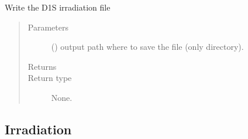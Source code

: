 \documentclass[letterpaper,10pt,english]{sphinxmanual}
\begin{document}
\begin{fulllineitems}
\begin{fulllineitems}
\end{fulllineitems}


\begin{fulllineitems}
\label{\detokenize{api/inputgeneration:parsersD1S.IrradiationFile.write}}
\sphinxAtStartPar
Write the D1S irradiation file
\begin{quote}\begin{description}
\item[{Parameters}] \leavevmode
\sphinxAtStartPar
{} () \textendash{} output path where to save the file (only directory).

\item[{Returns}] \leavevmode
\sphinxAtStartPar


\item[{Return type}] \leavevmode
\sphinxAtStartPar
None.

\end{description}\end{quote}

\end{fulllineitems}


\end{fulllineitems}



\subsection{Irradiation}
\label{\detokenize{api/inputgeneration:irradiation}}
\end{document}
